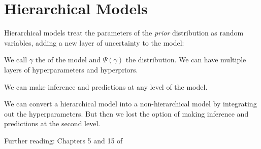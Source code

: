 
\section{Hierarchical Models}

Hierarchical models treat the parameters of the \emph{prior} distribution
as random variables, adding a new layer of uncertainty to the model:


We call $\gamma$ the  of the model and $\Psi(\gamma)$
the  distribution. We can have multiple layers of
hyperparameters and hyperpriors.

We can make inference and predictions at any level of the model.

\begin{note}
    We can convert a hierarchical model into a non-hierarchical
model by integrating out the hyperparameters. But then we lost the option
of making inference and predictions at the second level.
\end{note}

Further reading: Chapters 5 and 15 of \cite{gelman_bayesian_2013}
